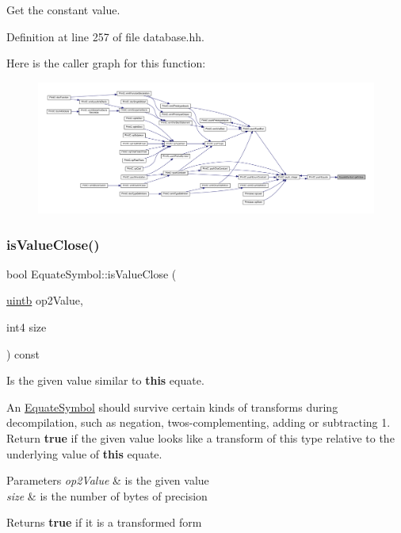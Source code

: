 Get the constant value. 



Definition at line 257 of file database.\+hh.

Here is the caller graph for this function\+:
\nopagebreak
\begin{figure}[H]
\begin{center}
\leavevmode
\includegraphics[width=350pt]{class_equate_symbol_a9615feaf12dc1c70c43169756ea25e58_icgraph}
\end{center}
\end{figure}
\mbox{\label{class_equate_symbol_a0e6f232ba80f3b57f66add5315881a4b}} 
\subsubsection{\texorpdfstring{isValueClose()}{isValueClose()}}
{\footnotesize\ttfamily bool Equate\+Symbol\+::is\+Value\+Close (\begin{DoxyParamCaption}\item[{\mbox{\hyperlink{types_8h_a2db313c5d32a12b01d26ac9b3bca178f}{uintb}}}]{op2\+Value,  }\item[{int4}]{size }\end{DoxyParamCaption}) const}



Is the given value similar to {\bfseries{this}} equate. 

An \mbox{\hyperlink{class_equate_symbol}{Equate\+Symbol}} should survive certain kinds of transforms during decompilation, such as negation, twos-\/complementing, adding or subtracting 1. Return {\bfseries{true}} if the given value looks like a transform of this type relative to the underlying value of {\bfseries{this}} equate. 
\begin{DoxyParams}{Parameters}
{\em op2\+Value} & is the given value \\
\hline
{\em size} & is the number of bytes of precision \\
\hline
\end{DoxyParams}
\begin{DoxyReturn}{Returns}
{\bfseries{true}} if it is a transformed form 
\end{DoxyReturn}


